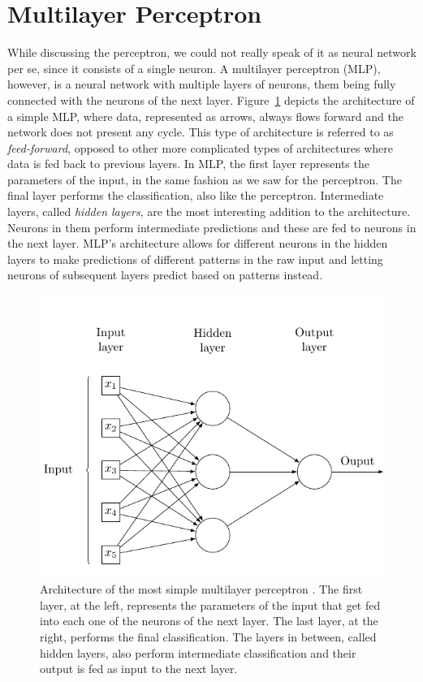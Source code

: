 
\section{Multilayer Perceptron}
\label{sec:theory:mlp}

While discussing the perceptron, we could not really speak of it as neural network per se, since it consists of a single neuron.
A multilayer perceptron (MLP), however, is a neural network with multiple layers of neurons, them being fully connected with the neurons of the next layer.
Figure~\ref{fig:sec:theory:mlp} depicts the architecture of a simple MLP, where data, represented as arrows, always flows forward and the network does not present any cycle.
This type of architecture is referred to as \emph{feed-forward}, opposed to other more complicated types of architectures where data is fed back to previous layers.
In MLP, the first layer represents the parameters of the input, in the same fashion as we saw for the perceptron.
The final layer performs the classification, also like the perceptron.
Intermediate layers, called \emph{hidden layers}, are the most interesting addition to the architecture.
Neurons in them perform intermediate predictions and these are fed to neurons in the next layer.
MLP's architecture allows for different neurons in the hidden layers to make predictions of different patterns in the raw input and letting neurons of subsequent layers predict based on patterns instead.

\begin{figure}[htb]
  \includegraphics[width=\textwidth]{tkz/mlp}
  \caption{Architecture of the most simple multilayer perceptron \cite{Medina2013A}.
  The first layer, at the left, represents the parameters of the input that get fed into each one of the neurons of the next layer.
  The last layer, at the right, performs the final classification.
  The layers in between, called hidden layers, also perform intermediate classification and their output is fed as input to the next layer.}
  \label{fig:sec:theory:mlp}
\end{figure}

